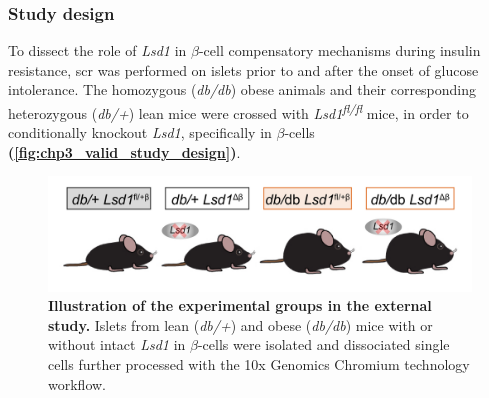 \subsubsection{\large Study design}

To dissect the role of \textit{Lsd1} in $\beta$-cell compensatory mechanisms during insulin resistance, \gls{scr} was performed on islets prior to and after the onset of glucose intolerance. The homozygous (\textit{db/db}) obese animals and their corresponding heterozygous (\textit{db/+}) lean mice were crossed with \textit{Lsd1\textsuperscript{fl/fl}} mice, in order to conditionally knockout \textit{Lsd1}, specifically in $\beta$-cells \textbf{(\autoref{fig:chp3_valid_study_design})}. 


\begin{figure}[H]
    \centering
    \includegraphics[width=\linewidth]{Chapter5/Fig/F3-17-02.png}
    \caption[Illustration of the experimental groups in the external study]{\textbf{Illustration of the experimental groups in the external study.} Islets from lean (\textit{db/+}) and obese (\textit{db/db}) mice with or without intact \textit{Lsd1} in $\beta$-cells were isolated and dissociated single cells further processed with the 10x Genomics Chromium technology workflow.}
    \label{fig:chp3_valid_study_design}
\end{figure}



